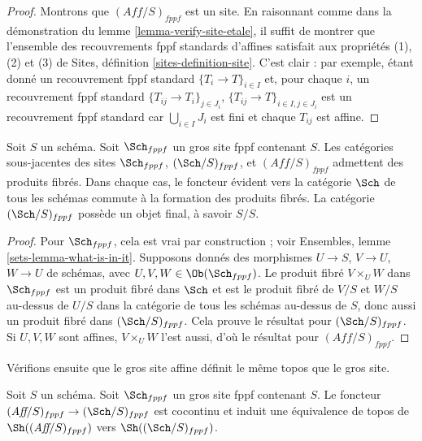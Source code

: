 \begin{proof}
Montrons que $(\textit{Aff}/S)_{fppf}$ est un site.
En raisonnant comme dans la démonstration du lemme \ref{lemma-verify-site-etale},
il suffit de montrer que l'ensemble
des recouvrements fppf standards d'affines satisfait aux propriétés
(1), (2) et (3) de
Sites, définition \ref{sites-definition-site}.
C'est clair : par exemple, étant donné un recouvrement fppf
standard $\{T_i \to T\}_{i\in I}$ et, pour chaque
$i$, un recouvrement fppf standard $\{T_{ij} \to T_i\}_{j\in J_i}$,
$\{T_{ij} \to T\}_{i \in I, j\in J_i}$ est un recouvrement fppf standard
car $\bigcup_{i\in I} J_i$ est fini et chaque $T_{ij}$ est affine.
\end{proof}

\begin{lemma}
\label{lemma-fibre-products-fppf}
Soit $S$ un schéma. Soit $\Sch_{fppf}$ un gros site
fppf contenant $S$. Les catégories sous-jacentes des sites
$\Sch_{fppf}$, $(\Sch/S)_{fppf}$,
et $(\textit{Aff}/S)_{fppf}$ admettent des produits fibrés.
Dans chaque cas, le foncteur évident vers la catégorie $\Sch$ de
tous les schémas commute à la formation des produits fibrés. La catégorie
$(\Sch/S)_{fppf}$ possède un objet final, à savoir $S/S$.
\end{lemma}

\begin{proof}
Pour $\Sch_{fppf}$, cela est vrai par construction ; voir
Ensembles, lemme \ref{sets-lemma-what-is-in-it}.
Supposons donnés des morphismes $U \to S$, $V \to U$, $W \to U$
de schémas, avec $U, V, W \in \Ob(\Sch_{fppf})$.
Le produit fibré $V \times_U W$ dans $\Sch_{fppf}$
est un produit fibré dans $\Sch$ et
est le produit fibré de $V/S$ et $W/S$ au-dessus de $U/S$ dans
la catégorie de tous les schémas au-dessus de $S$, donc aussi un
produit fibré dans $(\Sch/S)_{fppf}$.
Cela prouve le résultat pour $(\Sch/S)_{fppf}$.
Si $U, V, W$ sont affines, $V \times_U W$ l'est aussi, d'où le
résultat pour $(\textit{Aff}/S)_{fppf}$.
\end{proof}

\noindent
Vérifions ensuite que le gros site affine définit le même
topos que le gros site.

\begin{lemma}
\label{lemma-affine-big-site-fppf}
Soit $S$ un schéma. Soit $\Sch_{fppf}$ un gros site
fppf contenant $S$.
Le foncteur $(\textit{Aff}/S)_{fppf} \to (\Sch/S)_{fppf}$
est cocontinu et induit une équivalence de topos de
$\Sh((\textit{Aff}/S)_{fppf})$ vers
$\Sh((\Sch/S)_{fppf})$.
\end{lemma}

